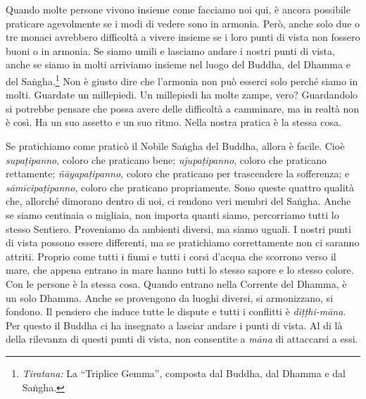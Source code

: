 Quando molte persone vivono insieme come facciamo noi qui, è ancora
possibile praticare agevolmente se i modi di vedere sono in armonia.
Però, anche solo due o tre monaci avrebbero difficoltà a vivere insieme
se i loro punti di vista non fossero buoni o in armonia. Se siamo umili
e lasciamo andare i nostri punti di vista, anche se siamo in molti
arriviamo insieme nel luogo del Buddha, del Dhamma e del
Saṅgha.\footnote{\emph{Tiratana:} La ``Triplice Gemma'', composta dal
  Buddha, dal Dhamma e dal Saṅgha.} Non è giusto dire che l'armonia non
può esserci solo perché siamo in molti. Guardate un millepiedi. Un
millepiedi ha molte zampe, vero? Guardandolo si potrebbe pensare che
possa avere delle difficoltà a camminare, ma in realtà non è così. Ha un
suo assetto e un suo ritmo. Nella nostra pratica è la stessa cosa.

Se pratichiamo come praticò il Nobile Saṅgha del Buddha, allora è
facile. Cioè \emph{supaṭipanno}, coloro che praticano bene;
\emph{ujupaṭipanno}, coloro che praticano rettamente;
\emph{ñāyapaṭipanno}, coloro che praticano per trascendere la
sofferenza; e \emph{sāmīcipaṭipanno}, coloro che praticano propriamente.
Sono queste quattro qualità che, allorché dimorano dentro di noi, ci
rendono veri membri del Saṅgha. Anche se siamo centinaia o migliaia, non
importa quanti siamo, percorriamo tutti lo stesso Sentiero. Proveniamo
da ambienti diversi, ma siamo uguali. I nostri punti di vista possono
essere differenti, ma se pratichiamo correttamente non ci saranno
attriti. Proprio come tutti i fiumi e tutti i corsi d'acqua che scorrono
verso il mare, che appena entrano in mare hanno tutti lo stesso sapore e
lo stesso colore. Con le persone è la stessa cosa. Quando entrano nella
Corrente del Dhamma, è un solo Dhamma. Anche se provengono da luoghi
diversi, si armonizzano, si fondono. Il pensiero che induce tutte le
dispute e tutti i conflitti è \emph{diṭṭhi-māna}. Per questo il Buddha
ci ha insegnato a lasciar andare i punti di vista. Al di là della
rilevanza di questi punti di vista, non consentite a \emph{māna} di
attaccarsi a essi.

